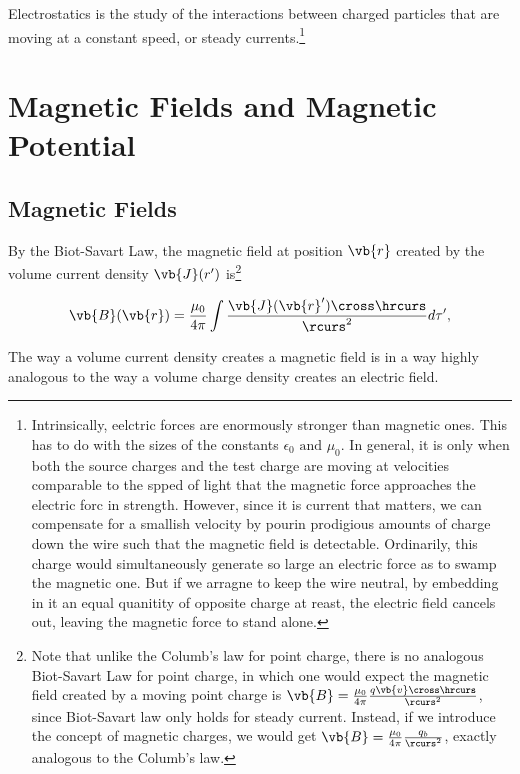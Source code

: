 \documentclass[english,a4paper,12pt]{report}
\begin{document}
Electrostatics is the study of the interactions between charged particles that are moving at a constant speed, or steady currents.\footnote{Intrinsically, eelctric forces are enormously stronger than magnetic ones. This has to do with the sizes of the constants \(\epsilon_0 \text { and } \mu_0 \). In general, it is only when both the source charges and the test charge are moving at velocities comparable to the spped of light that the magnetic force approaches the electric forc in strength. However, since it is current that matters, we can compensate for a smallish velocity by pourin prodigious amounts of charge down the wire such that the magnetic field is detectable. Ordinarily, this charge would simultaneously generate so large an electric force as to swamp the magnetic one. But if we arragne to keep the wire neutral, by embedding in it an equal quanitity of opposite charge at reast, the electric field cancels out, leaving the magnetic force to stand alone.} 

\section{Magnetic Fields and Magnetic Potential}

\subsection{Magnetic Fields}

By the Biot-Savart Law, the magnetic field at position \(\vb{r} \) created by the volume current density \(\vb{J} (r')\) is\footnote{Note that unlike the Columb's law for point charge, there is no analogous Biot-Savart Law for point charge, in which one would expect the magnetic field created by a moving point charge is \(\vb{B} = \frac{\mu_0}{4\pi} \frac{q \vb{v} \cross \hrcurs }{\rcurs ^2} \), since Biot-Savart law only holds for steady current. Instead, if we introduce the concept of magnetic charges, we would get \(\vb{B} = \frac{\mu_0}{4\pi} \frac{q_{b} }{\rcurs ^2} \), exactly analogous to the Columb's law.} 

\begin{equation}
    \vb{B} (\vb{r} ) = \frac{\mu _{0} }{4\pi }\int \frac{\vb{J} (\vb{r} ') \cross \hrcurs}{\rcurs ^2 } d\tau ',  
\end{equation}

The way a volume current density creates a magnetic field is in a way highly analogous to the way a volume charge density creates an electric field.
\end{document}
